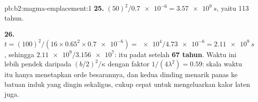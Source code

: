 \begin{solution}{pb:b2:magma-emplacement:1}
\textbf{25.} $(50)^2/\num{0.7e-6} = \qty{3.57e9}{s}$, yaitu 113 tahun.

\textbf{26.} $t = (100)^2/(16\times0.65^2\times\num{0.7e-6}) = \num{e4}/\num{4.73e-6} =
\qty{2.11e9}{s}$, sehingga $\num{2.11e9}/\num{3.156e7}$:  itu padat setelah
\textbf{\qty[text-series-to-math=true]{67}{} tahun}. Waktu ini lebih pendek daripada
$(b/2)^2/\kappa$ dengan faktor $1/(4\lambda^2) = 0.59$: skala waktu itu hanya menetapkan
orde besarannya, dan kedua dinding  menarik panas ke batuan induk yang dingin
sekaligus, cukup cepat untuk mengeluarkan kalor laten juga.
\end{solution}
